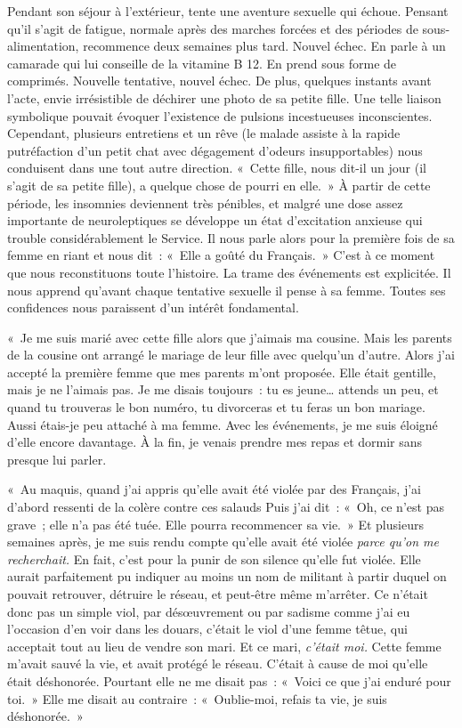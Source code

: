 \documentclass[french,twoside]{book} %
\begin{document}
Pendant son séjour à l’extérieur, tente une aventure sexuelle qui échoue. Pensant qu’il s’agit de fatigue, normale après des marches forcées et des périodes de sous-alimentation, recommence deux semaines plus tard. Nouvel échec. En parle à un camarade qui lui conseille de la vitamine B 12. En prend sous forme de comprimés. Nouvelle tentative, nouvel échec. De plus, quelques instants avant l’acte, envie irrésistible de déchirer une photo de sa petite fille. Une telle liaison symbolique pouvait évoquer l’existence de pulsions incestueuses inconscientes. Cependant, plusieurs entretiens et un rêve (le malade assiste à la rapide putréfaction d’un petit chat avec dégagement d’odeurs insupportables) nous conduisent dans une tout autre direction. « Cette fille, nous dit-il un jour (il s’agit de sa petite fille), a quelque chose de pourri en elle. » À partir de cette période, les insomnies deviennent très pénibles, et malgré une dose assez importante de neuroleptiques se développe un état d’excitation anxieuse qui trouble considérablement le Service. Il nous parle alors pour la première fois de sa femme en riant et nous dit : « Elle a goûté du Français. » C’est à ce moment que nous reconstituons toute l’histoire. La trame des événements est explicitée. Il nous apprend qu’avant chaque tentative sexuelle il pense à sa femme. Toutes ses confidences nous paraissent d’un intérêt fondamental.\par
 « Je me suis marié avec cette fille alors que j’aimais ma cousine. Mais les parents de la cousine ont arrangé le mariage de leur fille avec quelqu’un d’autre. Alors j’ai accepté la première femme que mes parents m’ont proposée. Elle était gentille, mais je ne l’aimais pas. Je me disais toujours : tu es jeune… attends un peu, et quand tu trouveras le bon numéro, tu divorceras et tu feras un bon mariage. Aussi étais-je peu attaché à ma femme. Avec les événements, je me suis éloigné d’elle encore davantage. À la fin, je venais prendre mes repas et dormir sans presque lui parler.\par
« Au maquis, quand j’ai appris qu’elle avait été violée par des Français, j’ai d’abord ressenti de la colère contre ces salauds Puis j’ai dit : « Oh, ce n’est pas grave ; elle n’a pas été tuée. Elle pourra recommencer sa vie. » Et plusieurs semaines après, je me suis rendu compte qu’elle avait été violée \emph{parce qu’on me recherchait.} En fait, c’est pour la punir de son silence qu’elle fut violée. Elle aurait parfaitement pu indiquer au moins un nom de militant à partir duquel on pouvait retrouver, détruire le réseau, et peut-être même m’arrêter. Ce n’était donc pas un simple viol, par désœuvrement ou par sadisme comme j’ai eu l’occasion d’en voir dans les douars, c’était le viol d’une femme têtue, qui acceptait tout au lieu de vendre son mari. Et ce mari, \emph{c’était moi.} Cette femme m’avait sauvé la vie, et avait protégé le réseau. C’était à cause de moi qu’elle était déshonorée. Pourtant elle ne me disait pas : « Voici ce que j’ai enduré pour toi. » Elle me disait au contraire : « Oublie-moi, refais ta vie, je suis déshonorée. »\par
\end{document}
